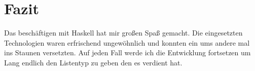 \documentclass[12pt,german]{article}
\begin{document}
\section{Fazit}

Das beschäftigen mit Haskell hat mir großen Spaß gemacht. Die
eingesetzten Technologien waren erfrischend ungewöhnlich und konnten
ein ums andere mal ins Staunen versetzten. Auf jeden Fall werde ich
die Entwicklung fortsetzen um Lang endlich den Listentyp zu geben den
es verdient hat.

\newpage


\end{document}

